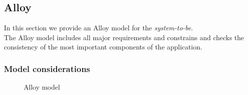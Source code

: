 \newpage
\subsection{Alloy} %
In this section we provide an Alloy model for the \emph{system-to-be}.\\
The Alloy model includes all major requirements and constrains and checks the consistency of the most important components of the application.



\newpage

\subsubsection{Model considerations} %
\label{ssub:model_considerations}

\begin{landscape}
\begin{figure}[h!t]
\caption{Alloy model}
	\noindent{}
\centering
\end{figure}
\end{landscape}


